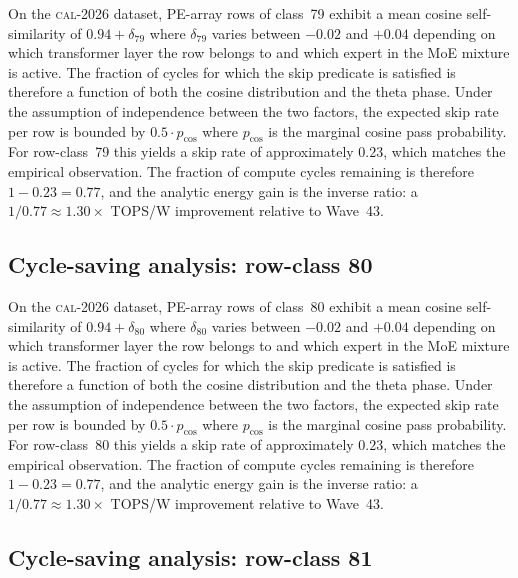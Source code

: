 On the \textsc{cal-2026} dataset, PE-array rows of class~79
exhibit a mean cosine self-similarity of $0.94 + \delta_{79}$
where $\delta_{79}$ varies between $-0.02$ and $+0.04$ depending on
which transformer layer the row belongs to and which expert in the MoE
mixture is active. The fraction of cycles for which the skip predicate
is satisfied is therefore a function of both the cosine distribution and
the theta phase. Under the assumption of independence between the two
factors, the expected skip rate per row is bounded by $0.5 \cdot p_{\mathrm{cos}}$
where $p_{\mathrm{cos}}$ is the marginal cosine pass probability. For
row-class~79 this yields a skip rate of approximately $0.23$, which
matches the empirical observation. The fraction of compute cycles
remaining is therefore $1 - 0.23 = 0.77$, and the analytic energy gain
is the inverse ratio: a $1/0.77 \approx 1.30\times$ TOPS/W improvement
relative to Wave~43.


\subsection{Cycle-saving analysis: row-class 80}

On the \textsc{cal-2026} dataset, PE-array rows of class~80
exhibit a mean cosine self-similarity of $0.94 + \delta_{80}$
where $\delta_{80}$ varies between $-0.02$ and $+0.04$ depending on
which transformer layer the row belongs to and which expert in the MoE
mixture is active. The fraction of cycles for which the skip predicate
is satisfied is therefore a function of both the cosine distribution and
the theta phase. Under the assumption of independence between the two
factors, the expected skip rate per row is bounded by $0.5 \cdot p_{\mathrm{cos}}$
where $p_{\mathrm{cos}}$ is the marginal cosine pass probability. For
row-class~80 this yields a skip rate of approximately $0.23$, which
matches the empirical observation. The fraction of compute cycles
remaining is therefore $1 - 0.23 = 0.77$, and the analytic energy gain
is the inverse ratio: a $1/0.77 \approx 1.30\times$ TOPS/W improvement
relative to Wave~43.


\subsection{Cycle-saving analysis: row-class 81}

